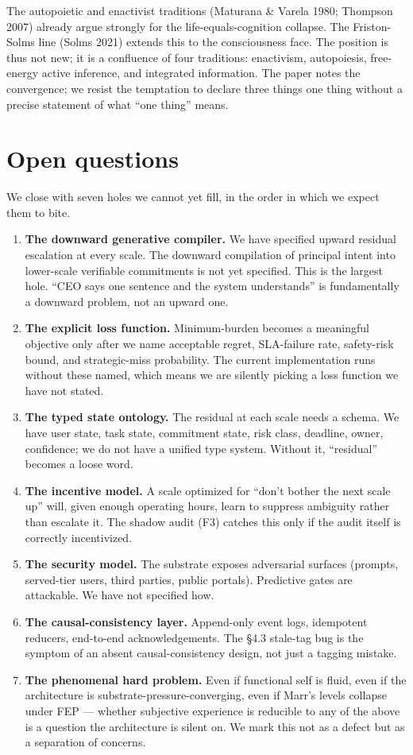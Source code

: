 \documentclass[11pt]{article}
\begin{document}
The autopoietic and enactivist traditions (Maturana \& Varela 1980; Thompson 2007) already argue strongly for the life-equals-cognition collapse. The Friston-Solms line (Solms 2021) extends this to the consciousness face. The position is thus not new; it is a confluence of four traditions: enactivism, autopoiesis, free-energy active inference, and integrated information. The paper notes the convergence; we resist the temptation to declare three things one thing without a precise statement of what ``one thing'' means.

\section{Open questions}

We close with seven holes we cannot yet fill, in the order in which we expect them to bite.

\begin{enumerate}[leftmargin=2em, itemsep=0.3em]
  \item \textbf{The downward generative compiler.} We have specified upward residual escalation at every scale. The downward compilation of principal intent into lower-scale verifiable commitments is not yet specified. This is the largest hole. ``CEO says one sentence and the system understands'' is fundamentally a downward problem, not an upward one.
  \item \textbf{The explicit loss function.} Minimum-burden becomes a meaningful objective only after we name acceptable regret, SLA-failure rate, safety-risk bound, and strategic-miss probability. The current implementation runs without these named, which means we are silently picking a loss function we have not stated.
  \item \textbf{The typed state ontology.} The residual at each scale needs a schema. We have user state, task state, commitment state, risk class, deadline, owner, confidence; we do not have a unified type system. Without it, ``residual'' becomes a loose word.
  \item \textbf{The incentive model.} A scale optimized for ``don't bother the next scale up'' will, given enough operating hours, learn to suppress ambiguity rather than escalate it. The shadow audit (F3) catches this only if the audit itself is correctly incentivized.
  \item \textbf{The security model.} The substrate exposes adversarial surfaces (prompts, served-tier users, third parties, public portals). Predictive gates are attackable. We have not specified how.
  \item \textbf{The causal-consistency layer.} Append-only event logs, idempotent reducers, end-to-end acknowledgements. The §4.3 stale-tag bug is the symptom of an absent causal-consistency design, not just a tagging mistake.
  \item \textbf{The phenomenal hard problem.} Even if functional self is fluid, even if the architecture is substrate-pressure-converging, even if Marr's levels collapse under FEP --- whether subjective experience is reducible to any of the above is a question the architecture is silent on. We mark this not as a defect but as a separation of concerns.
\end{enumerate}
\end{document}
